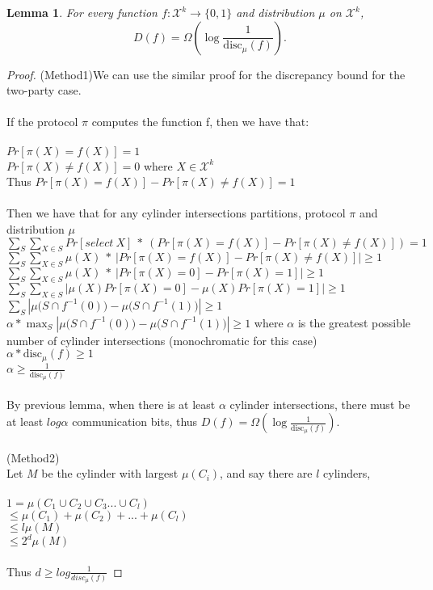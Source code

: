 \documentclass[11pt,oneside]{book}
\theoremstyle{plain}
\newtheorem{lemma}{Lemma}
\theoremstyle{definition}
\theoremstyle{plain}
\newcommand{\calX}{\mathcal{X}}
\newcommand{\disc}{\mathrm{disc}}
\begin{document}
	
	\begin{lemma}
		For every function $f : \calX^k \to \{0,1\}$ and distribution $\mu$ on $\calX^k$,
		\[
		D(f) = \Omega\left( \log \frac{1}{\disc_\mu(f)}\right).
		\]
	\end{lemma}
	
	\begin{proof}
	(Method1)We can use the similar proof for the discrepancy bound for the two-party case.\\
	\\
	If the protocol $\pi$ computes the function f, then we have that:\\
	\\
	$Pr[\pi(X) = f(X)] = 1$\\
	$Pr[\pi(X) \neq f(X)] = 0$ where $X \in \calX^k$\\
	Thus $Pr[\pi(X) = f(X)] - Pr[\pi(X) \neq f(X)]= 1$\\
	\\
	Then we have that for any cylinder intersections partitions, protocol $\pi$ and distribution $\mu$\\
	$\sum_{S}\sum_{X\in S} Pr[select\ X]\ *\ (Pr[\pi(X) = f(X)] - Pr[\pi(X) \neq f(X)]) = 1$\\
	$\sum_{S}\sum_{X\in S} \mu(X)\ *\ |Pr[\pi(X) = f(X)] - Pr[\pi(X) \neq f(X)]| \ge 1$\\
	$\sum_{S}\sum_{X\in S} \mu(X)\ *\ |Pr[\pi(X) = 0] - Pr[\pi(X) = 1]| \ge 1$\\
	$\sum_{S}\sum_{X\in S} |\mu(X)Pr[\pi(X) = 0] - \mu(X)Pr[\pi(X) = 1]| \ge 1$\\
	$\sum_{S} |\mu\big( S \cap f^{-1}(0) \big) - \mu\big( S \cap f^{-1}(1)\big)|  \ge 1$\\
	$\alpha * \max_{S} |\mu\big( S \cap f^{-1}(0) \big) - \mu\big( S \cap f^{-1}(1)\big)|  \ge 1$ where $\alpha$ is the greatest possible number of cylinder intersections (monochromatic for this case)\\
	$\alpha * \disc_\mu(f) \ge 1$\\
	$\alpha \ge \frac{1}{\disc_\mu(f)}$\\
	\\
	By previous lemma, when there is at least $\alpha$ cylinder intersections, there must be at least $log\alpha$ communication bits, thus $D(f) = \Omega\left( \log \frac{1}{\disc_\mu(f)}\right)$.\\
		\\
	(Method2)\\
	Let $M$ be the cylinder with largest $\mu(C_i)$, and say there are $l$ cylinders,\\
	 \\
	$1=\mu(C_1\cup C_2\cup C_3...\cup C_l)$\\
	$\leq \mu(C_1)+\mu(C_2)+...+\mu(C_l)$\\
	$\leq l\mu(M)$\\
	$\leq 2^d\mu(M)$\\
	 \\
	Thus $d\ge log\frac{1}{disc_{\mu}(f)}$
	\end{proof}
	
\end{document}

